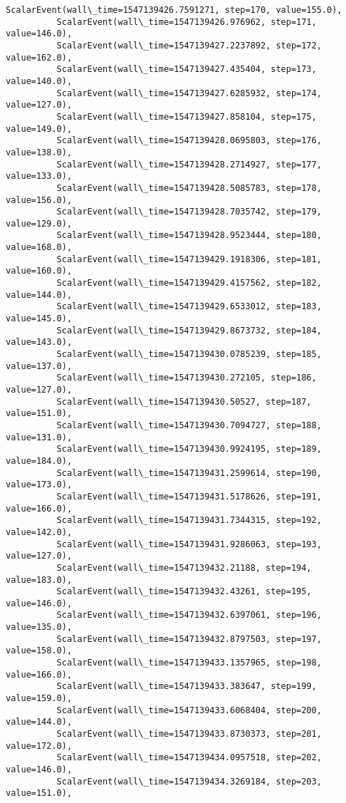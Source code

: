 \documentclass[11pt]{article}
\begin{document}
\begin{Verbatim}[commandchars=\\\{\}]
          ScalarEvent(wall\_time=1547139426.7591271, step=170, value=155.0),
          ScalarEvent(wall\_time=1547139426.976962, step=171, value=146.0),
          ScalarEvent(wall\_time=1547139427.2237892, step=172, value=162.0),
          ScalarEvent(wall\_time=1547139427.435404, step=173, value=140.0),
          ScalarEvent(wall\_time=1547139427.6285932, step=174, value=127.0),
          ScalarEvent(wall\_time=1547139427.858104, step=175, value=149.0),
          ScalarEvent(wall\_time=1547139428.0695803, step=176, value=138.0),
          ScalarEvent(wall\_time=1547139428.2714927, step=177, value=133.0),
          ScalarEvent(wall\_time=1547139428.5085783, step=178, value=156.0),
          ScalarEvent(wall\_time=1547139428.7035742, step=179, value=129.0),
          ScalarEvent(wall\_time=1547139428.9523444, step=180, value=168.0),
          ScalarEvent(wall\_time=1547139429.1918306, step=181, value=160.0),
          ScalarEvent(wall\_time=1547139429.4157562, step=182, value=144.0),
          ScalarEvent(wall\_time=1547139429.6533012, step=183, value=145.0),
          ScalarEvent(wall\_time=1547139429.8673732, step=184, value=143.0),
          ScalarEvent(wall\_time=1547139430.0785239, step=185, value=137.0),
          ScalarEvent(wall\_time=1547139430.272105, step=186, value=127.0),
          ScalarEvent(wall\_time=1547139430.50527, step=187, value=151.0),
          ScalarEvent(wall\_time=1547139430.7094727, step=188, value=131.0),
          ScalarEvent(wall\_time=1547139430.9924195, step=189, value=184.0),
          ScalarEvent(wall\_time=1547139431.2599614, step=190, value=173.0),
          ScalarEvent(wall\_time=1547139431.5178626, step=191, value=166.0),
          ScalarEvent(wall\_time=1547139431.7344315, step=192, value=142.0),
          ScalarEvent(wall\_time=1547139431.9286063, step=193, value=127.0),
          ScalarEvent(wall\_time=1547139432.21188, step=194, value=183.0),
          ScalarEvent(wall\_time=1547139432.43261, step=195, value=146.0),
          ScalarEvent(wall\_time=1547139432.6397061, step=196, value=135.0),
          ScalarEvent(wall\_time=1547139432.8797503, step=197, value=158.0),
          ScalarEvent(wall\_time=1547139433.1357965, step=198, value=166.0),
          ScalarEvent(wall\_time=1547139433.383647, step=199, value=159.0),
          ScalarEvent(wall\_time=1547139433.6068404, step=200, value=144.0),
          ScalarEvent(wall\_time=1547139433.8730373, step=201, value=172.0),
          ScalarEvent(wall\_time=1547139434.0957518, step=202, value=146.0),
          ScalarEvent(wall\_time=1547139434.3269184, step=203, value=151.0),

\end{Verbatim}
\end{document}
